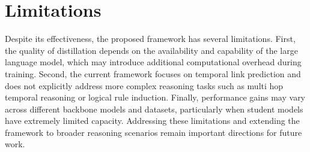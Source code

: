 \documentclass[11pt]{article}
\begin{document}
\section*{Limitations}

Despite its effectiveness, the proposed framework has several limitations. First, the quality of distillation depends on the availability and capability of the large language model, which may introduce additional computational overhead during training. Second, the current framework focuses on temporal link prediction and does not explicitly address more complex reasoning tasks such as multi hop temporal reasoning or logical rule induction. Finally, performance gains may vary across different backbone models and datasets, particularly when student models have extremely limited capacity. Addressing these limitations and extending the framework to broader reasoning scenarios remain important directions for future work.



%

\end{document}
